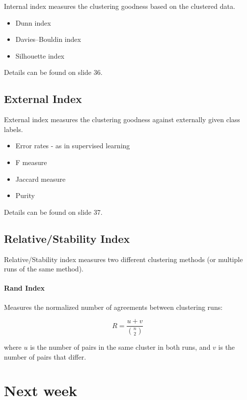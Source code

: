 \documentclass{idc_msc}
\begin{document}
Internal index measures the clustering goodness based on the clustered data.

\begin{itemize}
  \item Dunn index
  \item Davies–Bouldin index
  \item Silhouette index
\end{itemize}

Details can be found on slide 36.

\subsection{External Index}

External index measures the clustering goodness against externally given class labels.

\begin{itemize}
  \item Error rates - as in supervised learning
  \item F measure
  \item Jaccard measure
  \item Purity
\end{itemize}

Details can be found on slide 37.

\subsection{Relative/Stability Index}

Relative/Stability index measures two different clustering methods (or multiple runs of the same method).

\paragraph{Rand Index}

Measures the normalized number of agreements between clustering runs:

\[R = \frac{u+v}{\binom{n}{2}}\]

where \(u\) is the number of pairs in the same cluster in both runs, and \(v\) is the number of pairs that differ.

\section{Next week}
\end{document}
